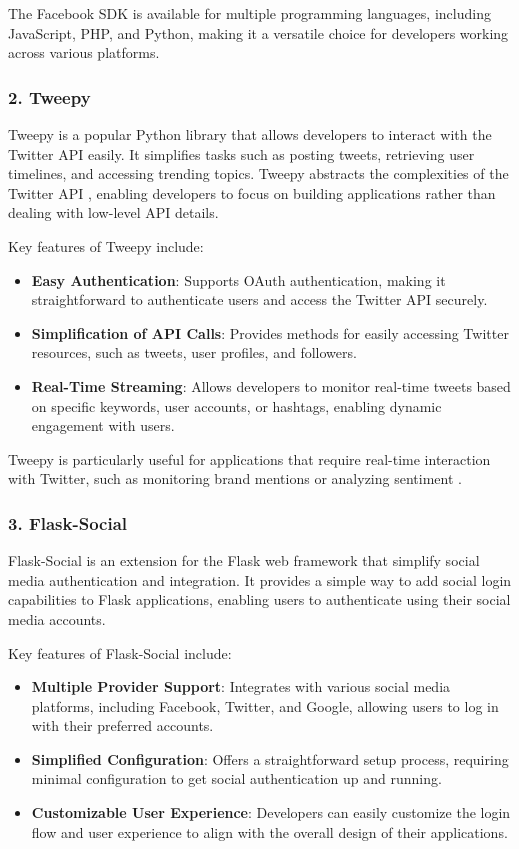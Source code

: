 The Facebook SDK is available for multiple programming languages, including JavaScript, PHP, and Python, making it a versatile choice for developers working across various platforms.

\subsubsection{2. Tweepy}

Tweepy is a popular Python library that allows developers to interact with the Twitter API easily. It simplifies tasks such as posting tweets, retrieving user timelines, and accessing trending topics. Tweepy abstracts the complexities of the Twitter API \cite{twitter_api_documentation}, enabling developers to focus on building applications rather than dealing with low-level API details.

Key features of Tweepy include:
\begin{itemize}
    \item \textbf{Easy Authentication}: Supports OAuth authentication, making it straightforward to authenticate users and access the Twitter API securely.
    \item \textbf{Simplification of API Calls}: Provides methods for easily accessing Twitter resources, such as tweets, user profiles, and followers.
    \item \textbf{Real-Time Streaming}: Allows developers to monitor real-time tweets based on specific keywords, user accounts, or hashtags, enabling dynamic engagement with users.
\end{itemize}

Tweepy is particularly useful for applications that require real-time interaction with Twitter, such as monitoring brand mentions or analyzing sentiment \cite{tweepy_documentation}.

\subsubsection{3. Flask-Social}

Flask-Social is an extension for the Flask web framework that simplify social media authentication and integration. It provides a simple way to add social login capabilities to Flask applications, enabling users to authenticate using their social media accounts.

Key features of Flask-Social include:
\begin{itemize}
    \item \textbf{Multiple Provider Support}: Integrates with various social media platforms, including Facebook, Twitter, and Google, allowing users to log in with their preferred accounts.
    \item \textbf{Simplified Configuration}: Offers a straightforward setup process, requiring minimal configuration to get social authentication up and running.
    \item \textbf{Customizable User Experience}: Developers can easily customize the login flow and user experience to align with the overall design of their applications.
\end{itemize}

